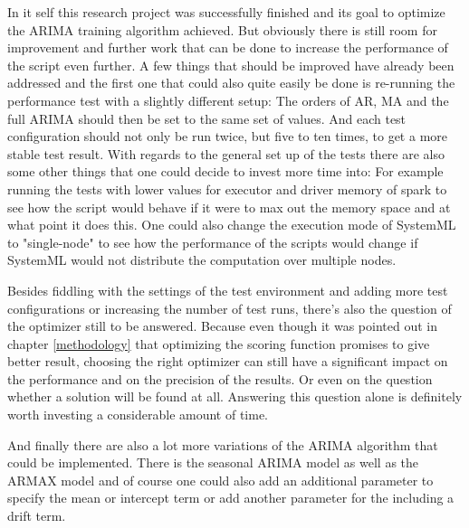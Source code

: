 In it self this research project was successfully finished and its goal to optimize the \acs{ARIMA} training algorithm achieved. But obviously there is still room for improvement and further work that can be done to increase the performance of the script even further. A few things that should be improved have already been addressed and the first one that could also quite easily be done is re-running the performance test with a slightly different setup: The orders of \acs{AR}, \acs{MA} and the full \acs{ARIMA} should then be set to the same set of values. And each test configuration should not only be run twice, but five to ten times, to get a more stable test result. With regards to the general set up of the tests there are also some other things that one could decide to invest more time into: For example running the tests with lower values for executor and driver memory of spark to see how the script would behave if it were to max out the memory space and at what point it does this. One could also change the execution mode of SystemML to "single-node" to see how the performance of the scripts would change if SystemML would not distribute the computation over multiple nodes.

Besides fiddling with the settings of the test environment and adding more test configurations or increasing the number of test runs, there's also the question of the optimizer still to be answered. Because even though it was pointed out in chapter \ref{methodology} that optimizing the scoring function promises to give better result, choosing the right optimizer can still have a significant impact on the performance and on the precision of the results. Or even on the question whether a solution will be found at all. Answering this question alone is definitely worth investing a considerable amount of time.

And finally there are also a lot more variations of the \acs{ARIMA} algorithm that could be implemented. There is the seasonal \acl{ARIMA} model as well as the \acl{ARMAX} model and of course one could also add an additional parameter to specify the mean or intercept term or add another parameter for the including a drift term.